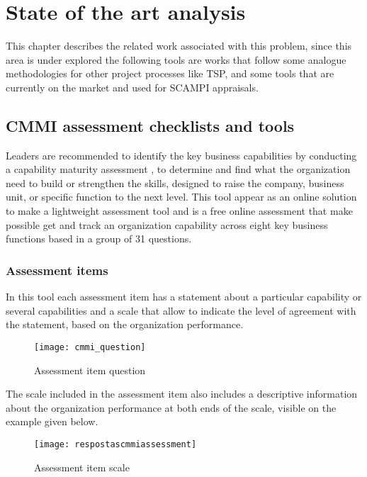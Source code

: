 \chapter{State of the art analysis}\label{chap:chap3}

This chapter describes the related work associated with this problem, since this area is under explored the following tools are works that follow some analogue methodologies for other project processes like TSP, and some tools that are currently on the market and used for SCAMPI appraisals.

\section{CMMI assessment checklists and tools}
Leaders are recommended to identify the key business capabilities  by conducting a capability maturity assessment \citep{Hutchinson2014}, to determine and find what the organization need to build or strengthen the skills, designed to raise the company, business unit, or specific function to the next level. This tool appear as an online solution to make a lightweight assessment tool and is a free online assessment that make possible get and track an organization capability across eight key business functions based in a group of 31 questions.


\subsection{Assessment items}
In this tool each assessment item has a statement about a particular capability or several capabilities and a scale that allow to indicate the level of agreement with the statement, based on the organization performance. 

\begin{figure}[h]
	\begin{center}
		\leavevmode
		\texttt{[image: cmmi\_question]}
		\caption{Assessment item question}
		\label{fig:cmmi_question}
	\end{center}
\end{figure}

The scale included in the assessment item also includes a descriptive information about the organization performance at both ends of the scale, visible on the example given below.

\begin{figure}[h]
	\begin{center}
		\leavevmode
		\texttt{[image: respostascmmiassessment]}
		\caption{Assessment item scale}
		\label{fig:assesment_answer}
	\end{center}
\end{figure}

